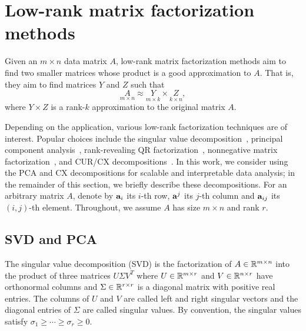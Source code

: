 \section{Low-rank matrix factorization methods}
\label{sxn:low-rank-methods}

Given an $m \times n$ data matrix $A$, low-rank matrix factorization methods
aim to find two smaller matrices whose product is a good approximation to $A$.
That is, they aim to find matrices $Y$ and $Z$ such that
\begin{equation}
 \label{eqn:apprx}
    \underset{m\times n}{A} \approx \underset{m\times k}{Y} \times \underset{k\times n}{Z} , 
\end{equation}
where $Y \times Z$ is a rank-$k$ approximation to the original matrix $A$.

Depending on the application, various low-rank factorization techniques are of
interest.  Popular choices include the singular value
decomposition~\cite{GVL96}, principal component analysis~\cite{pcaBook},
rank-revealing QR factorization~\cite{GE96}, nonnegative matrix
factorization~\cite{NMFalg}, and CUR/CX decompositions~\cite{CUR_PNAS}.  In
this work, we consider using the PCA and CX decompositions for scalable and
interpretable data analysis; in the remainder of this section, we briefly
describe these decompositions.
For an arbitrary matrix $A$, denote by $\mathbf{a}_i$
its $i$-th row, $\mathbf{a}^j$ its $j$-th column and $\mathbf{a}_{ij}$ its $(i,j)$-th element.
Throughout, we assume $A$ has size $m \times n$ and rank $r$.


\subsection{SVD and PCA}

The singular value decomposition (SVD) is the factorization of $A \in
\mathbb{R}^{m\times n}$ into the product of three matrices $U\Sigma V^T$ where $U
\in \mathbb{R}^{m\times r}$ and $V\in \mathbb{R}^{n\times r}$ have orthonormal columns
and $\Sigma\in \mathbb{R}^{r\times r}$ is a diagonal matrix with positive real
entries. The columns of $U$ and $V$ are called left and right singular vectors
and the diagonal entries of $\Sigma$ are called singular values. By convention, the singular values satisfy $\sigma_1\geq
\cdots \geq \sigma_r\geq 0$.
 
